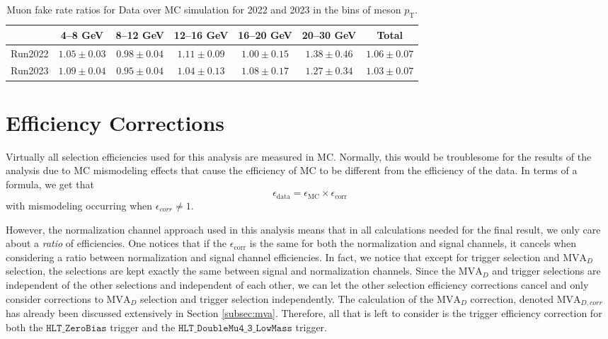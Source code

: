 \begin{table}[htbp]
    \centering
    \begin{tabular}{|c|c|c|c|c|c|c|}
    \hline
     & \textbf{4--8 GeV} & \textbf{8--12 GeV} & \textbf{12--16 GeV} & \textbf{16--20 GeV} & \textbf{20--30 GeV} & \textbf{Total} \\
    \hline
    Run2022 & $1.05 \pm 0.03$ & $0.98 \pm 0.04$ & $1.11 \pm 0.09$ & $1.00 \pm 0.15$ & $1.38 \pm 0.46$ & $1.06 \pm 0.07$ \\
    Run2023 & $1.09 \pm 0.04$ & $0.95 \pm 0.04$ & $1.04 \pm 0.13$ & $1.08 \pm 0.17$ & $1.27 \pm 0.34$ & $1.03 \pm 0.07$ \\
    \hline
    \end{tabular}
    \caption{Muon fake rate ratios for Data over MC simulation for 2022 and 2023 in the bins of meson $p_\mathrm{T}$.}
    \label{tab:muon_fake_rate}
\end{table}


\section{Efficiency Corrections}
\label{sec:efficiency_corrections}


Virtually all selection efficiencies used for this analysis are measured in MC. Normally, this would be troublesome for the results of the analysis due to MC mismodeling effects that cause the efficiency of MC to be different from the efficiency of the data. In terms of a formula, we get that 
\begin{equation}
    \epsilon_{\text{data}} = \epsilon_{\text{MC}} \times \epsilon_{\text{corr}}
\end{equation}
with mismodeling occurring when $\epsilon_{corr} \neq 1$. 

However, the normalization channel approach used in this analysis means that in all calculations needed for the final result, we only care about a \textit{ratio} of efficiencies. One notices that if the $\epsilon_{\text{corr}}$ is the same for both the normalization and signal channels, it cancels when considering a ratio between normalization and signal channel efficiencies. In fact, we notice that except for trigger selection and $\text{MVA}_D$ selection, the selections are kept exactly the same between signal and normalization channels. Since the $\text{MVA}_D$ and trigger selections are independent of the other selections and independent of each other, we can let the other selection efficiency corrections cancel and only consider corrections to $\text{MVA}_D$ selection and trigger selection independently. The calculation of the $\text{MVA}_D$ correction, denoted $\text{MVA}_{D,corr}$ has already been discussed extensively in Section \ref{subsec:mva}. Therefore, all that is left to consider is the trigger efficiency correction for both the $\texttt{HLT\_ZeroBias}$ trigger and the $\texttt{HLT\_DoubleMu4\_3\_LowMass}$ trigger. 


